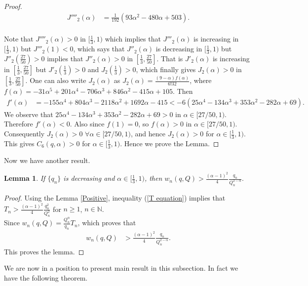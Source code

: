 \documentclass[12pt]{amsart}
\newtheorem{Lemma}[Theorem]{\sc Lemma}
\theoremstyle{definition}
\theoremstyle{plain}
\theoremstyle{definition}
\numberwithin{equation}{section}
\begin{document}
\begin{proof}
\begin{align*}
J''''_{2}(\alpha)&=\frac{1}{192}(93\alpha^{2}-480\alpha+503).
\end{align*}\\
Note that $J''''_{2}(\alpha)>0$ in $[\frac{1}{3}, 1)$ which implies that $J'''_{2}(\alpha)$ is increasing in $[\frac{1}{3}, 1)$ but $J'''_{2}(1)<0$, which says that $J''_{2}(\alpha)$ is decreasing in $[\frac{1}{3}, 1)$ but $J''_{2}(\frac{27}{50})>0$ implies that $J''_{2}(\alpha)>0$ in $[\frac{1}{3}, \frac{27}{50}]$. That is $J'_{2}(\alpha)$ is increasing in $[\frac{1}{3}, \frac{27}{50}]$ but $J'_{2}(\frac{1}{3})>0$ and $J_{2}(\frac{1}{3})>0$, which finally gives $J_{2}(\alpha)>0$ in $[\frac{1}{3}, \frac{27}{50}]$. One can also write $J_{2}(\alpha)$ as $J_{2}(\alpha)=\frac{(9-\alpha)f(\alpha)}{6!32}$,
where $f(\alpha)=-31\alpha^{5}+201\alpha^{4}-706\alpha^{3}+846\alpha^{2}-415\alpha+105$. Then
\begin{align*}
 f'(\alpha)&=-155\alpha^{4}+804\alpha^{3}-2118\alpha^{2}+1692\alpha-415<-6(25\alpha^{4}-134\alpha^{3}+353\alpha^{2}-282\alpha+69).
 \end{align*}We observe that $25\alpha^{4}-134\alpha^{3}+353\alpha^{2}-282\alpha+69>0$ in $\alpha\in[27/50, 1)$. Therefore $f'(\alpha)<0$. Also since $f(1)=0$, so
 $f(\alpha)>0$ in $\alpha\in[27/50, 1)$. Consequently $J_{2}(\alpha)>0$ $\forall\alpha\in[27/50,1)$, and hence $J_{2}(\alpha)>0$ for $\alpha\in[\frac{1}{3}, 1)$. This gives $C_{6}(q,\alpha)>0$ for $\alpha\in[\frac{1}{3}, 1)$. Hence we prove the Lemma.
\end{proof}
Now we have another result.
\begin{Lemma}{\label{STRICTLYP}}
If $\{q_{n}\}$ is decreasing and $\alpha\in[\frac{1}{3},1)$, then $w_{n}(q, Q)>\frac{(\alpha-1)^{2}}{4}\frac{q_{n}}{Q_{n}^{2-\alpha}}.$
\end{Lemma}
\begin{proof}
Using the Lemma \ref{Positive}, inequality (\ref{T equation}) implies that $T_{n}>\frac{(\alpha-1)^{2}}{4}\frac{q_{n}^{2}}{Q_{n}^{2}}$ for $n\geq 1$, $n\in \mathbb{N}$.\\
Since $w_{n}(q, Q)=\frac{Q_{n}^{\alpha}}{q_{n}}T_{n}$, which proves that
\begin{align*}
w_{n}(q, Q)& >\frac{(\alpha-1)^{2}}{4}\frac{q_{n}}{Q_{n}^{2-\alpha}}.
\end{align*}
This proves the lemma.
\end{proof}
We are now in a position to present main result in this subsection. In fact we have the following theorem.
\end{document}

